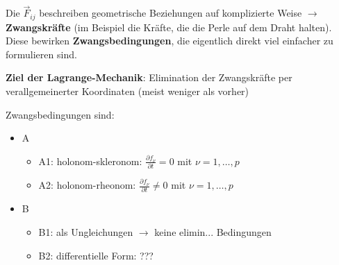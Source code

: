 Die $\vec{F}_{ij}$ beschreiben geometrische Beziehungen auf komplizierte Weise $\rightarrow$ \textbf{Zwangskräfte} (im Beispiel die Kräfte, die die Perle auf dem Draht halten). Diese bewirken \textbf{Zwangsbedingungen}, die eigentlich direkt viel einfacher zu formulieren sind.

\textbf{Ziel der Lagrange-Mechanik}: Elimination der Zwangskräfte per verallgemeinerter Koordinaten (meist weniger als vorher)

Zwangsbedingungen sind:
\begin{itemize}
	\item A
	\begin{itemize}
		\item A1: holonom-skleronom: $\frac{\partial f_\nu}{\partial t} = 0$ mit $\nu = 1, \dots, p$ 
		\item A2: holonom-rheonom: $\frac{\partial f_\nu}{\partial t} \neq 0$ mit $\nu = 1, \dots, p$
	\end{itemize}
	\item B
	\begin{itemize}
		\item B1: als Ungleichungen $\rightarrow$ keine elimin... Bedingungen
		\item B2: differentielle Form: ???
	\end{itemize}
\end{itemize}


